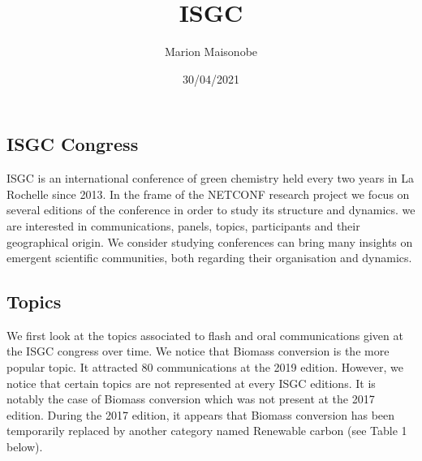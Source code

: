 \documentclass[
]{article}
\title{ISGC}
\author{Marion Maisonobe}
\date{30/04/2021}
\begin{document}
\maketitle

\hypertarget{isgc-congress}{%
\subsection{ISGC Congress}\label{isgc-congress}}

ISGC is an international conference of green chemistry held every two
years in La Rochelle since 2013. In the frame of the NETCONF research
project we focus on several editions of the conference in order to study
its structure and dynamics. we are interested in communications, panels,
topics, participants and their geographical origin. We consider studying
conferences can bring many insights on emergent scientific communities,
both regarding their organisation and dynamics.

\hypertarget{topics}{%
\subsection{Topics}\label{topics}}

We first look at the topics associated to flash and oral communications
given at the ISGC congress over time. We notice that Biomass conversion
is the more popular topic. It attracted 80 communications at the 2019
edition. However, we notice that certain topics are not represented at
every ISGC editions. It is notably the case of Biomass conversion which
was not present at the 2017 edition. During the 2017 edition, it appears
that Biomass conversion has been temporarily replaced by another
category named Renewable carbon (see Table 1 below).
\end{document}

